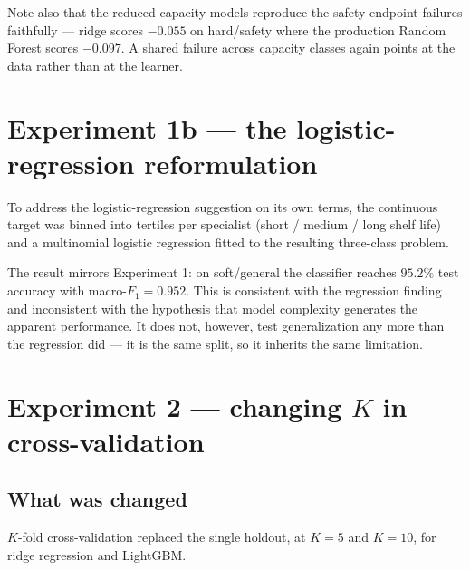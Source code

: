 Note also that the reduced-capacity models reproduce the safety-endpoint
failures faithfully --- ridge scores $-0.055$ on hard/safety where the
production Random Forest scores $-0.097$. A shared failure across
capacity classes again points at the data rather than at the learner.

\section{Experiment 1b --- the logistic-regression reformulation}
\label{sec:logistic}

To address the logistic-regression suggestion on its own terms, the
continuous target was binned into tertiles per specialist (short / medium /
long shelf life) and a multinomial logistic regression fitted to the
resulting three-class problem.



The result mirrors Experiment 1: on soft/general the classifier reaches
$95.2\%$ test accuracy with macro-$F_1 = 0.952$. This is consistent with
the regression finding and inconsistent with the hypothesis that model
complexity generates the apparent performance. It does not, however, test
generalization any more than the regression did --- it is the same split,
so it inherits the same limitation.

\section{Experiment 2 --- changing $K$ in cross-validation}

\subsection{What was changed}

$K$-fold cross-validation replaced the single holdout, at $K = 5$ and
$K = 10$, for ridge regression and LightGBM.



